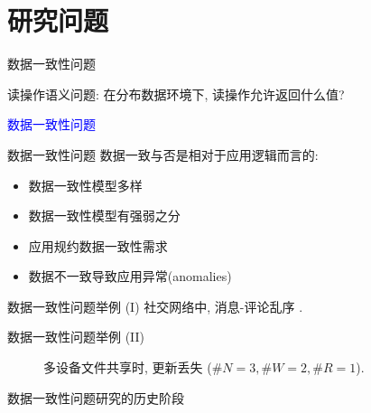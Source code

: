 \section{研究问题}

\begin{frame}{数据一致性问题}

  \begin{center}
	读操作语义问题: 在分布数据环境下, 读操作允许返回什么值?
  \end{center}

  \pause
  \vspace{1.00cm}

  \begin{center}
	\textcolor{blue}{\Large 数据一致性问题}
  \end{center}
\end{frame}
\begin{frame}{数据一致性问题}
  数据一致与否是相对于应用逻辑而言的:
  \pause
  \begin{itemize}[<+->]
	\setlength\itemsep{8pt}
	\item 数据一致性模型多样
	\item 数据一致性模型有强弱之分
	\item 应用规约数据一致性需求
	\item 数据不一致导致应用异常(anomalies)
  \end{itemize}
\end{frame}
\begin{frame}{数据一致性问题举例 (I)}
  {社交网络中, 消息-评论乱序 .}
\end{frame}
\begin{frame}{数据一致性问题举例 (II)}
  \begin{figure}[h!]
    \centering
    \begin{adjustbox}{max totalsize = {0.65\textwidth}{0.65\textheight}, center}
      
    \end{adjustbox}
    \caption{多设备文件共享时, 更新丢失 ($\#N = 3, \#W = 2, \#R = 1$).}
  \end{figure}
\end{frame}
\begin{frame}{数据一致性问题研究的历史阶段}

\end{frame}
